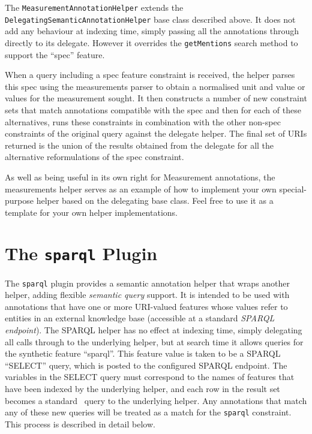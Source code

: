 The {\tt MeasurementAnnotationHelper} extends the
{\tt DelegatingSemanticAnnotationHelper} base class described above.  It does
not add any behaviour at indexing time, simply passing all the annotations
through directly to its delegate.  However it overrides the {\tt getMentions}
search method to support the ``spec'' feature.

When a query including a spec feature constraint is received, the helper parses
this spec using the measurements parser to obtain a normalised unit and value
or values for the measurement sought.  It then constructs a number of new
constraint sets that match annotations compatible with the spec and then for
each of these alternatives, runs these constraints in combination with the
other non-spec constraints of the original query against the delegate helper.
The final set of URIs returned is the union of the results obtained from the
delegate for all the alternative reformulations of the spec constraint.

As well as being useful in its own right for Measurement annotations, the
measurements helper serves as an example of how to implement your own
special-purpose helper based on the delegating base class.  Feel free to use it
as a template for your own helper implementations.

\section{The {\tt sparql} Plugin}\label{sec:plugins:sparql}

The {\tt sparql} plugin provides a semantic annotation helper that wraps
another helper, adding flexible {\em semantic query} support.  It is intended
to be used with annotations that have one or more URI-valued features whose
values refer to entities in an external knowledge base (accessible at a
standard {\em SPARQL endpoint}).  The SPARQL helper has no effect at indexing
time, simply delegating all calls through to the underlying helper, but at
search time it allows queries for the synthetic feature ``sparql''.  This
feature value is taken to be a SPARQL ``SELECT'' query, which is posted
to the configured SPARQL endpoint.  The variables in the SELECT query must
correspond to the names of features that have been indexed by the underlying
helper, and each row in the result set becomes a standard \Mimir\ query to the
underlying helper.  Any annotations that match any of these new queries will be
treated as a match for the {\tt sparql} constraint.  This process is described
in detail below.

